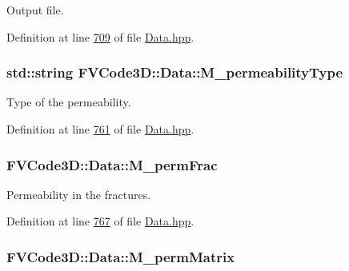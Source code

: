 Output file. 



Definition at line \hyperlink{Data_8hpp_source_l00709}{709} of file \hyperlink{Data_8hpp_source}{Data.\+hpp}.

\subsubsection[{\texorpdfstring{M\+\_\+permeability\+Type}{M_permeabilityType}}]{\setlength{\rightskip}{0pt plus 5cm}std\+::string F\+V\+Code3\+D\+::\+Data\+::\+M\+\_\+permeability\+Type\hspace{0.3cm}{\ttfamily [protected]}}\hypertarget{classFVCode3D_1_1Data_a313a43a63768026ac108106fa90113c9}{}\label{classFVCode3D_1_1Data_a313a43a63768026ac108106fa90113c9}


Type of the permeability. 



Definition at line \hyperlink{Data_8hpp_source_l00761}{761} of file \hyperlink{Data_8hpp_source}{Data.\+hpp}.

\subsubsection[{\texorpdfstring{M\+\_\+perm\+Frac}{M_permFrac}}]{ F\+V\+Code3\+D\+::\+Data\+::\+M\+\_\+perm\+Frac\hspace{0.3cm}{\ttfamily [protected]}}\hypertarget{classFVCode3D_1_1Data_a68f9fa864f076c053ae8ac8a3f86f7ea}{}\label{classFVCode3D_1_1Data_a68f9fa864f076c053ae8ac8a3f86f7ea}


Permeability in the fractures. 



Definition at line \hyperlink{Data_8hpp_source_l00767}{767} of file \hyperlink{Data_8hpp_source}{Data.\+hpp}.

\subsubsection[{\texorpdfstring{M\+\_\+perm\+Matrix}{M_permMatrix}}]{ F\+V\+Code3\+D\+::\+Data\+::\+M\+\_\+perm\+Matrix\hspace{0.3cm}{\ttfamily [protected]}}\hypertarget{classFVCode3D_1_1Data_aa91f66274ed34a57c63f5c106b371109}{}\label{classFVCode3D_1_1Data_aa91f66274ed34a57c63f5c106b371109}


